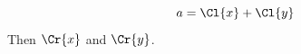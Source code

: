 \documentclass{article}
\begin{document}
\begin{equation} a = \Cl{x} + \Cl{y} \end{equation}
Then $\Cr{x}$ and $\Cr{y}$.
\end{document}
